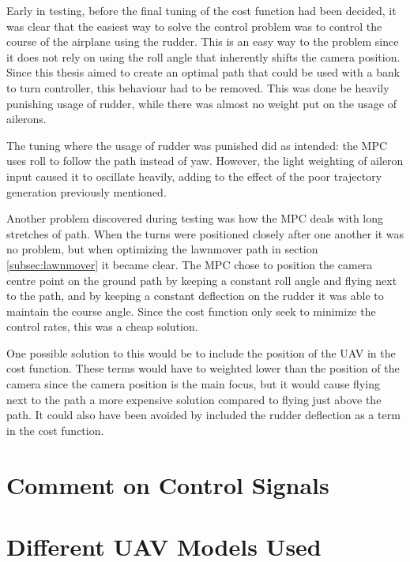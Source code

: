 Early in testing, before the final tuning of the cost function had been decided, it was clear that the easiest way to solve the control problem was to control the course of the airplane using the rudder. This is an easy way to the problem since it does not rely on using the roll angle that inherently shifts the camera position. Since this thesis aimed to create an optimal path that could be used with a bank to turn controller, this behaviour had to be removed. This was done be heavily punishing usage of rudder, while there was almost no weight put on the usage of ailerons.

The tuning where the usage of rudder was punished did as intended: the MPC uses roll to follow the path instead of yaw. However, the light weighting of aileron input caused it to oscillate heavily, adding to the effect of the poor trajectory generation previously mentioned.

Another problem discovered during testing was how the MPC deals with long stretches of path. When the turns were positioned closely after one another it was no problem, but when optimizing the lawnmover path in section \ref{subsec:lawnmover} it became clear. The MPC chose to position the camera centre point on the ground path by keeping a constant roll angle and flying next to the path, and by keeping a constant deflection on the rudder it was able to maintain the course angle. Since the cost function only seek to minimize the control rates, this was a cheap solution.

One possible solution to this would be to include the position of the UAV in the cost function. These terms would have to weighted lower than the position of the camera since the camera position is the main focus, but it would cause flying next to the path a more expensive solution compared to flying just above the path. It could also have been avoided by included the rudder deflection as a term in the cost function.


\section{Comment on Control Signals}

\section{Different UAV Models Used}